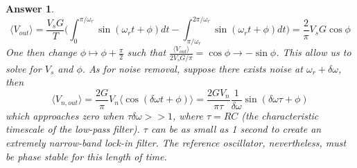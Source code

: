 \documentclass[a4paper]{article}
\newtheorem{ans}{Answer}[section]
\theoremstyle{new}
\begin{document}
\begin{ans}
$$\langle V_{out}\rangle=\frac{V_sG}{T}\bigg(\int_0^{\pi/\omega_r}\sin(\omega_rt+\phi)dt-\int_{\pi/\omega_r}^{2\pi/\omega_r}\sin(\omega_rt+\phi)dt\bigg)=\frac{2}{\pi}V_sG\cos\phi$$
One then change $\phi\mapsto\phi+\frac{\pi}{2}$ such that $\frac{\langle V_{out}\rangle}{2V_sG/\pi}=\cos\phi\rightarrow-\sin\phi$. This allow us to solve for $V_s$ and $\phi$. As for noise removal, suppose there exists noise at $\omega_r+\delta\omega$, then
$$\langle V_{n,out}\rangle=\frac{2G}{\pi}V_n\langle\cos(\delta\omega t+\phi)\rangle=\frac{2GV_n}{\pi\tau}\frac{1}{\delta\omega}\sin(\delta\omega\tau+\phi)$$
which approaches zero when $\tau\delta\omega>>1$, where $\tau=RC$ (the characteristic timescale of the low-pass filter). $\tau$ can be as small as 1 second to create an extremely narrow-band lock-in filter. The reference oscillator, nevertheless, must be phase stable for this length of time.
\end{ans}
\newpage
\end{document}
